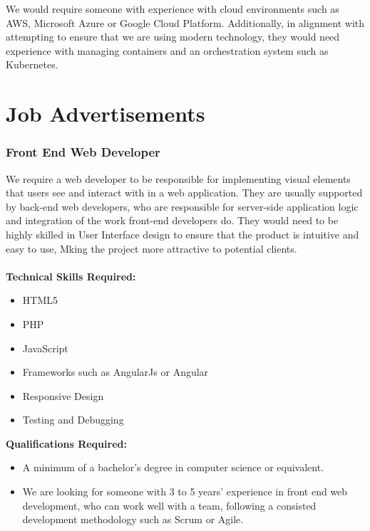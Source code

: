 \documentclass[11pt, oneside, a4paper, titlepage]{article}
\begin{document}
We would require someone with experience with cloud environments such as AWS, Microsoft Azure or Google Cloud Platform.  Additionally, in alignment with attempting to ensure that we are using modern technology, they would need experience with managing containers and an orchestration system such as Kubernetes. 
\newpage

\section{Job Advertisements}
\subsubsection{Front End Web Developer}
We require a web developer to be responsible for implementing visual elements that users see and interact with in a web application. They are usually supported by back-end web developers, who are responsible for server-side application logic and integration of the work front-end developers do. They would need to be highly skilled in User Interface design to ensure that the product is intuitive and easy to use, Mking the project more attractive to potential clients.  
\\
\\
\textbf{Technical Skills Required:}
\begin{itemize}
	\item HTML5
	\item PHP
	\item JavaScript
	\item Frameworks such as AngularJs or Angular
	\item Responsive Design
	\item Testing and Debugging
\end{itemize}
\hfill \break
\textbf{Qualifications Required:}
\begin{itemize}
	\item A minimum of a bachelor's degree in computer science or equivalent.
	\item We are looking for someone with 3 to 5 years' experience in front end web development, who can work well with a team, following a consisted development methodology such as Scrum or Agile.
\end{itemize}
\newpage
\end{document}
